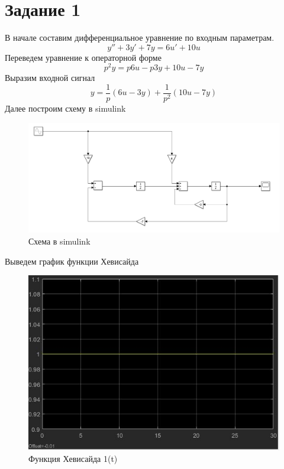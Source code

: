 \documentclass[a4paper, 12pt]{article}
\begin{document}
    \section{Задание 1}
        \noindent В начале составим дифференциальное уравнение по входным параметрам.
        $$y''+3y' + 7y = 6u' + 10u$$
        Переведем уравнение к операторной форме
        $$p^2y = p6u - p3y + 10u - 7y$$
        Выразим входной сигнал
        $$y = \frac{1}{p} (6u - 3y) + \frac{1}{p^2}(10u-7y)$$
        Далее построим схему в simulink
        \begin{figure}[H]
            \centering
            \includegraphics[scale=0.4]{sim.png}
            \captionsetup{skip=0pt}
            \caption{Схема в simulink}
            \label{fig:1imspdf}
        \end{figure}
        Выведем график функции Хевисайда
        \begin{figure}[H]
            \centering
            \includegraphics[scale=0.4]{hev.jpg}
            \captionsetup{skip=0pt}
            \caption{Функция Хевисайда 1(t)}
            \label{fig:2imspdf}
        \end{figure}\newpage
\end{document}

